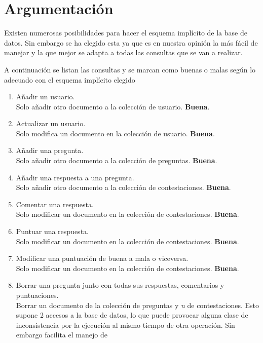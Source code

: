 \documentclass{article}
\begin{document}
  \section{Argumentación}
    Existen numerosas posibilidades para hacer el esquema implícito de la base de datos.
    Sin embargo se ha elegido esta ya que es en nuestra opinión la más fácil de manejar y
    la que mejor se adapta a todas las consultas que se van a realizar.
    \par
    A continuación se listan las consultas y se marcan como buenas o malas según lo adecuado
    con el esquema implícito elegido
    \par
    \begin{enumerate}
      \item Añadir un usuario. \\
      Solo añadir otro documento a la colección de usuario. \textbf{Buena}.
      \item Actualizar un usuario. \\
      Solo modifica un documento en la colección de usuario. \textbf{Buena}.
      \item Añadir una pregunta. \\
      Solo añadir otro documento a la colección de preguntas. \textbf{Buena}.      
      \item Añadir una respuesta a una pregunta. \\
      Solo añadir otro documento a la colección de contestaciones. \textbf{Buena}.
      \item Comentar una respuesta. \\
      Solo modificar un documento en la colección de contestaciones. \textbf{Buena}.
      \item Puntuar una respuesta. \\
      Solo modificar un documento en la colección de contestaciones. \textbf{Buena}.
      \item Modificar una puntuación de buena a mala o viceversa. \\
      Solo modificar un documento en la colección de contestaciones. \textbf{Buena}.
      \item Borrar una pregunta junto con todas sus respuestas, comentarios y puntuaciones. \\
      Borrar un documento de la colección de preguntas y \emph{n} de contestaciones.
      Esto supone 2 accesos a la base de datos, lo que puede provocar alguna clase de inconsistencia
      por la ejecución al mismo tiempo de otra operación. Sin embargo facilita el manejo de

\end{enumerate}
\end{document}
